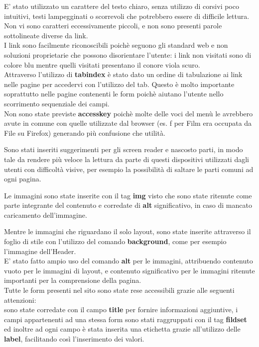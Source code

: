 E' stato utilizzato un carattere del testo chiaro, senza utilizzo di corsivi poco intuitivi, testi lampegginati o scorrevoli che potrebbero essere di difficile lettura.\\
Non vi sono caratteri eccessivamente piccoli, e non sono presenti parole sottolineate diverse da link.\\

I link sono facilmente riconoscibili poichè seguono gli standard web e non soluzioni proprietarie che possono disorientare l'utente: i link non visitati sono di colore blu mentre quelli visitati presentano il conore viola scuro.\\

Attraverso l'utilizzo di \textbf{tabindex} è stato dato un ordine di tabulazione ai link nelle pagine per accedervi con l'utilizzo del tab. Questo è molto importante soprattutto nelle pagine contenenti le form poichè aiutano l'utente nello scorrimento sequenziale dei campi.\\

Non sono state previste \textbf{accesskey} poichè molte delle voci del menù le avrebbero avute in comune con quelle utilizzate dal browser (es. f per Film era occupata da File su Firefox) generando più confusione che utilità.

Sono stati inseriti suggerimenti per gli screen reader e nascosto parti, in modo tale da rendere più veloce la lettura da parte di questi dispositivi utilizzati dagli utenti con difficoltà visive, per esempio la possibilità di saltare le parti comuni ad ogni pagina.


\n Le immagini sono state inserite con il tag \textbf{img} visto che sono state ritenute come parte integrante del contenuto e corredate di \textbf{alt} significativo, in caso di mancato caricamento dell'immagine.

Mentre le immagini che riguardano il solo layout, sono state inserite attraverso il foglio di stile con l'utilizzo del comando \textbf{background}, come per esempio l'immagine dell'Header.\\

E' stato fatto ampio uso del comando \textbf{alt} per le immagini, attribuendo contenuto vuoto per le immagini di layout, e contenuto significativo per le immagini ritenute importanti per la comprensione della pagina.\\

Tutte le form presenti nel sito sono state rese accessibili grazie alle seguenti attenzioni:\\
sono state corredate con il campo \textbf{title} per fornire informazioni aggiuntive, i campi appartenenti ad una stessa form sono stati raggruppati con il tag \textbf{fildset} ed inoltre ad ogni campo è stata inserita una etichetta grazie all'utilizzo delle \textbf{label}, facilitando così l'inserimento dei valori.\\

